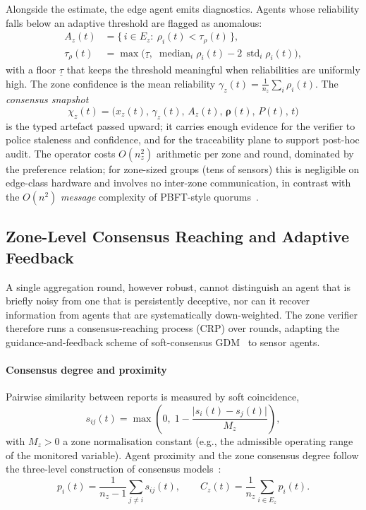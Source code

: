 \documentclass[preprint,11pt]{elsarticle}
\newcommand{\rel}{\rho}
\begin{document}
Alongside the estimate, the edge agent emits diagnostics. Agents whose
reliability falls below an adaptive threshold are flagged as anomalous:
\begin{equation}
\begin{aligned}
A_z(t)&=\bigl\{\, i \in E_z :\ \rel_i(t) < \tau_{\rho}(t) \,\bigr\},\\
\tau_{\rho}(t)&=\max\!\bigl(\underline{\tau},\;
\operatorname{median}_i \rel_i(t) - 2\,\operatorname{std}_i
\rel_i(t)\bigr),
\end{aligned}
\label{eq:anomaly}
\end{equation}
with a floor $\underline{\tau}$ that keeps the threshold meaningful
when reliabilities are uniformly high. The zone confidence is the mean
reliability $\gamma_z(t)=\frac{1}{n_z}\sum_i \rel_i(t)$. The
\emph{consensus snapshot}
\begin{equation}
\chi_z(t)=\bigl(\hat{x}_z(t),\,\gamma_z(t),\,A_z(t),\,
\boldsymbol{\rel}(t),\,P(t),\,t\bigr)
\label{eq:snapshot}
\end{equation}
is the typed artefact passed upward; it carries enough evidence for the
verifier to police staleness and confidence, and for the traceability
plane to support post-hoc audit. The operator costs
$O(n_z^2)$ arithmetic per zone and round, dominated by the preference
relation; for zone-sized groups (tens of sensors) this is negligible on
edge-class hardware and involves no inter-zone communication, in
contrast with the $O(n^2)$ \emph{message} complexity of
PBFT-style quorums~\cite{castro1999}.

\subsection{Zone-Level Consensus Reaching and Adaptive Feedback}
\label{sec:crp}

A single aggregation round, however robust, cannot distinguish an agent
that is briefly noisy from one that is persistently deceptive, nor can
it recover information from agents that are systematically
down-weighted. The zone verifier therefore runs a consensus-reaching
process (CRP) over rounds, adapting the guidance-and-feedback scheme of
soft-consensus GDM~\cite{herreraviedma2002,herreraviedma2007,
cabrerizo2009,cabrerizo2010kbs} to sensor agents.

\paragraph{Consensus degree and proximity}
Pairwise similarity between reports is measured by soft coincidence,
\begin{equation}
s_{ij}(t)=\max\!\left(0,\;1-\frac{\lvert s_i(t)-s_j(t)\rvert}{M_z}\right),
\label{eq:similarity}
\end{equation}
with $M_z>0$ a zone normalisation constant (e.g., the admissible
operating range of the monitored variable). Agent proximity and the
zone consensus degree follow the three-level construction of
consensus models~\cite{cabrerizo2009}:
\begin{equation}
p_i(t)=\frac{1}{n_z-1}\sum_{j\neq i}s_{ij}(t),
\qquad
C_z(t)=\frac{1}{n_z}\sum_{i\in E_z}p_i(t).
\label{eq:consensusdegree}
\end{equation}
\end{document}
